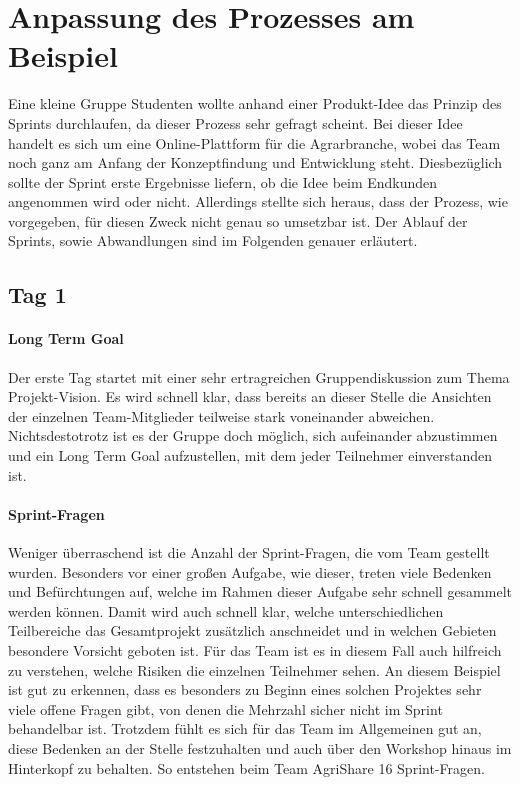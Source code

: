 \section{Anpassung des Prozesses am Beispiel}
Eine kleine Gruppe Studenten wollte anhand einer Produkt-Idee das Prinzip des Sprints durchlaufen, da dieser Prozess sehr gefragt scheint. Bei dieser Idee handelt es sich um eine Online-Plattform für die Agrarbranche, wobei das Team noch ganz am Anfang der Konzeptfindung und Entwicklung steht. Diesbezüglich sollte der Sprint erste Ergebnisse liefern, ob die Idee beim Endkunden angenommen wird oder nicht. Allerdings stellte sich heraus, dass der Prozess, wie vorgegeben, für diesen Zweck nicht genau so umsetzbar ist. Der Ablauf der Sprints, sowie Abwandlungen sind im Folgenden genauer erläutert.
\subsection*{Tag 1}
\paragraph{Long Term Goal}
Der erste Tag startet mit einer sehr ertragreichen Gruppendiskussion zum Thema Projekt-Vision. Es wird schnell klar, dass bereits an dieser Stelle die Ansichten der einzelnen Team-Mitglieder teilweise stark voneinander abweichen. Nichtsdestotrotz ist es der Gruppe doch möglich, sich aufeinander abzustimmen und ein Long Term Goal aufzustellen, mit dem jeder Teilnehmer einverstanden ist.
%
%
\paragraph{Sprint-Fragen}
Weniger überraschend ist die Anzahl der Sprint-Fragen, die vom Team gestellt wurden. Besonders vor einer großen Aufgabe, wie dieser, treten viele Bedenken und Befürchtungen auf, welche im Rahmen dieser Aufgabe sehr schnell gesammelt werden können. Damit wird auch schnell klar, welche unterschiedlichen Teilbereiche das Gesamtprojekt zusätzlich anschneidet und in welchen Gebieten besondere Vorsicht geboten ist. Für das Team ist es in diesem Fall auch hilfreich zu verstehen, welche Risiken die einzelnen Teilnehmer sehen. An diesem Beispiel ist gut zu erkennen, dass es besonders zu Beginn eines solchen Projektes sehr viele offene Fragen gibt, von denen die Mehrzahl sicher nicht im Sprint behandelbar ist. Trotzdem fühlt es sich für das Team im Allgemeinen gut an, diese Bedenken an der Stelle festzuhalten und auch über den Workshop hinaus im Hinterkopf zu behalten. So entstehen beim Team AgriShare 16 Sprint-Fragen.

